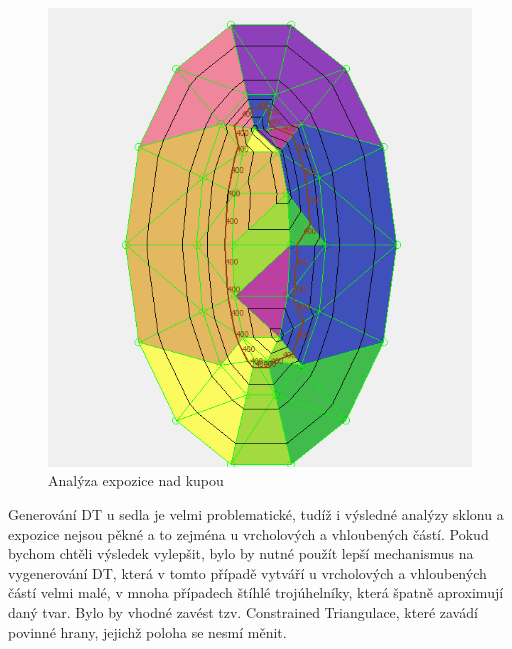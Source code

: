 \documentclass[a4paper,11pt,twoside]{article}
\begin{document}
\vspace{0.2cm}
\begin{figure}[hbt!] 
\begin{center}
\includegraphics[width=13cm]{pictures/hill_aspect.PNG} 
\caption[Analýza expozice nad kupou]{Analýza expozice nad kupou}
\label{fig:hill_aspect}
\end{center}
\end{figure}

\newpage
Generování DT u sedla je velmi problematické, tudíž i výsledné analýzy sklonu a expozice nejsou pěkné a to zejména u vrcholových a vhloubených částí. Pokud bychom chtěli výsledek vylepšit, bylo by nutné použít lepší mechanismus na vygenerování DT, která v tomto případě vytváří u vrcholových a vhloubených částí velmi malé, v mnoha případech štíhlé trojúhelníky, která špatně aproximují daný tvar. Bylo by vhodné zavést tzv. Constrained Triangulace, které zavádí povinné hrany, jejichž poloha se nesmí měnit.
\end{document}
